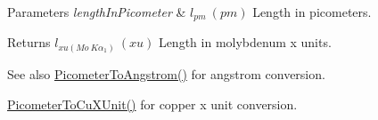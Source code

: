 \begin{DoxyParams}{Parameters}
{\em length\+In\+Picometer} & $ l_{pm}\ (pm)$ Length in picometers. \\
\hline
\end{DoxyParams}
\begin{DoxyReturn}{Returns}
$ l_{xu(Mo\ K\alpha_1)}\ (xu)$ Length in molybdenum x units. 
\end{DoxyReturn}
\begin{DoxySeeAlso}{See also}
\mbox{\hyperlink{group___e_g_x_math-_conversions-_length_conversions-_picometer-_non-_s_i_ga0b1b4a3ec4ea0110477f4547025d2719}{Picometer\+To\+Angstrom()}} for angstrom conversion. 

\mbox{\hyperlink{group___e_g_x_math-_conversions-_length_conversions-_picometer-_non-_s_i_gab393c0c7c90ba14ff56f8eac343524ff}{Picometer\+To\+Cu\+X\+Unit()}} for copper x unit conversion. 
\end{DoxySeeAlso}
